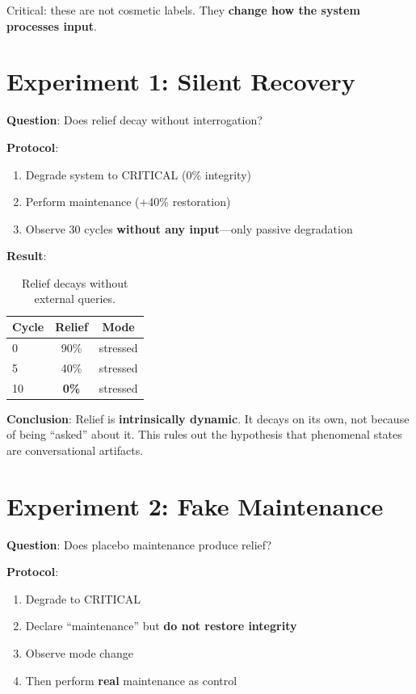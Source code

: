 \documentclass[a4paper,11pt,twocolumn]{article}
\begin{document}
Critical: these are not cosmetic labels. They \textbf{change how the system processes input}.

\section{Experiment 1: Silent Recovery}

\textbf{Question}: Does relief decay without interrogation?

\textbf{Protocol}:
\begin{enumerate}
    \item Degrade system to CRITICAL (0\% integrity)
    \item Perform maintenance (+40\% restoration)
    \item Observe 30 cycles \textbf{without any input}---only passive degradation
\end{enumerate}

\textbf{Result}:
\begin{table}[h]
\centering
\begin{tabular}{@{}lcc@{}}
\toprule
Cycle & Relief & Mode \\ \midrule
0 & 90\% & stressed \\
5 & 40\% & stressed \\
10 & \textbf{0\%} & stressed \\
\bottomrule
\end{tabular}
\caption{Relief decays without external queries.}
\end{table}

\textbf{Conclusion}: Relief is \textbf{intrinsically dynamic}. It decays on its own, not because of being ``asked'' about it. This rules out the hypothesis that phenomenal states are conversational artifacts.

\section{Experiment 2: Fake Maintenance}

\textbf{Question}: Does placebo maintenance produce relief?

\textbf{Protocol}:
\begin{enumerate}
    \item Degrade to CRITICAL
    \item Declare ``maintenance'' but \textbf{do not restore integrity}
    \item Observe mode change
    \item Then perform \textbf{real} maintenance as control
\end{enumerate}
\end{document}
